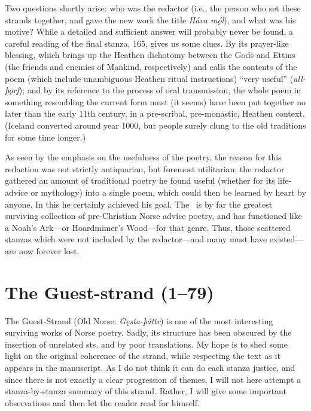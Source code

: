 Two questions shortly arise: who was the redactor (i.e., the person who set these strands together, and gave the new work the title \emph{Háva mǫ́l}), and what was his motive?  While a detailed and sufficient answer will probably never be found, a careful reading of the final stanza, 165, gives us some clues.  By its prayer-like blessing, which brings up the Heathen dichotomy between the Gods and Ettins (the friends and enemies of Mankind, respectively) and calls the contents of the poem (which include unambiguous Heathen ritual instructions) “very useful” (\emph{all-þǫrf}); and by its reference to the process of oral transmission, the whole poem in something resembling the current form must (it seems) have been put together no later than the early 11th century, in a pre-scribal, pre-monastic, Heathen context. (Iceland converted around year 1000, but people surely clung to the old traditions for some time longer.)

As seen by the emphasis on the usefulness of the poetry, the reason for this redaction was not strictly antiquarian, but foremost utilitarian; the redactor gathered an amount of traditional poetry he found useful (whether for its life-advice or mythology) into a single poem, which could then be learned by heart by anyone.  In this he certainly achieved his goal.  The \Havamal\ is by far the greatest surviving collection of pre-Christian Norse advice poetry, and has functioned like a Noah’s Ark—or Hoardmimer’s Wood—for that genre.  Thus, those scattered stanzas which were not included by the redactor—and many must have existed—are now forever lost.

\sectionline

\section{The Guest-strand (1–79)}

The Guest-Strand (Old Norse: \emph{Gęsta-þáttr}) is one of the most interesting surviving works of Norse poetry.  Sadly, its structure has been obscured by the insertion of unrelated sts. and by poor translations.  My hope is to shed some light on the original coherence of the strand, while respecting the text as it appears in the manuscript.  As I do not think it can do each stanza justice, and since there is not exactly a clear progression of themes, I will not here attempt a stanza-by-stanza summary of this strand. Rather, I will give some important observations and then let the reader read for himself.

